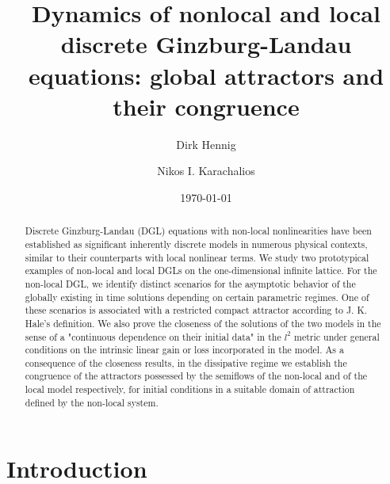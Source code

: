 \documentclass[preprintnumbers,amsmath,amssymb]{revtex4}
\begin{document}
\title{Dynamics of nonlocal and local discrete Ginzburg-Landau equations: global attractors and their congruence}
	
\author{Dirk Hennig}
	\author{Nikos I. Karachalios}
\date{\today}

\begin{abstract}
Discrete Ginzburg-Landau (DGL) equations with non-local nonlinearities have been established as significant inherently discrete models in numerous physical contexts, similar to their counterparts with local nonlinear terms.  We study two prototypical examples of non-local and local DGLs on the one-dimensional infinite lattice. For the non-local DGL, we identify distinct scenarios for the asymptotic behavior of the globally existing in time solutions depending on certain parametric regimes. One of these scenarios is associated with a restricted compact attractor according to J. K. Hale's definition.  We also prove the closeness of the solutions of the two models  in the sense of a "continuous dependence on their initial data" in the $l^2$ metric under general conditions on the intrinsic linear gain or loss incorporated in the model. As a consequence of the closeness results, in the dissipative regime we establish the congruence of the attractors  possessed  by the semiflows of the non-local and of the local model respectively, for initial conditions in a suitable domain of attraction defined by the non-local system. 
\end{abstract}

\maketitle
\section{Introduction}
\end{document}
